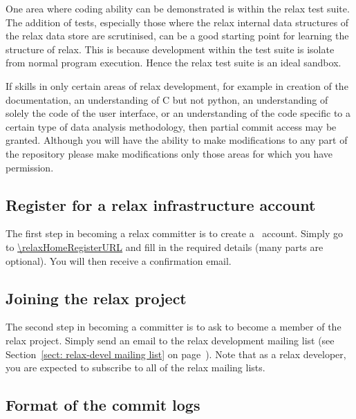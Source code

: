 One area where coding ability can be demonstrated is within the relax test suite.
The addition of tests, especially those where the relax internal data structures of the relax data store are scrutinised, can be a good starting point for learning the structure of relax.
This is because development within the test suite is isolate from normal program execution.
Hence the relax test suite is an ideal sandbox.

If skills in only certain areas of relax development, for example in creation of the documentation, an understanding of C but not python, an understanding of solely the code of the user interface, or an understanding of the code specific to a certain type of data analysis methodology, then partial commit access may be granted.
Although you will have the ability to make modifications to any part of the repository please make modifications only those areas for which you have permission.



\subsection{Register for a relax infrastructure account}

The first step in becoming a relax committer is to create a \relaxHome\ account\index{\relaxHome}.
Simply go to \url{\relaxHomeRegisterURL} and fill in the required details (many parts are optional).
You will then receive a confirmation email.



\subsection{Joining the relax project}

The second step in becoming a committer is to ask to become a member of the relax project.
Simply send an email to the relax development mailing list (see Section~\ref{sect: relax-devel mailing list} on page~\pageref{sect: relax-devel mailing list}).
Note that as a relax developer, you are expected to subscribe to all of the relax mailing lists.


\subsection{Format of the commit logs}\label{commit log format}

